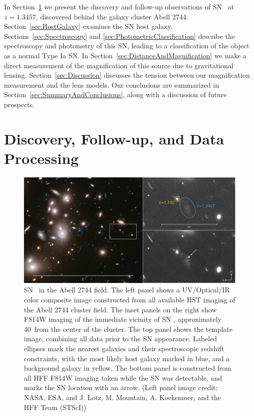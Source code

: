 In Section~\ref{sec:DiscoveryAndFollowup} we present the discovery and
follow-up observations of SN \tomas\ at $z=1.3457$, discovered behind
the galaxy cluster Abell 2744.  Section~\ref{sec:HostGalaxy} examines
the SN host galaxy.  Sections~\ref{sec:Spectroscopy}
and \ref{sec:PhotometricClassification} describe the spectroscopy and
photometry of this SN, leading to a classification of the object as a
normal Type Ia SN.  In Section~\ref{sec:DistanceAndMagnification} we
make a direct measurement of the magnification of this source due to
gravitational lensing.  Section~\ref{sec:Discussion} discusses the
tension between our magnification measurement and the lens models. Our
conclusions are summarized in Section~\ref{sec:SummaryAndConclusions},
along with a discussion of future prospects. 

\section{Discovery, Follow-up, and Data Processing}
\label{sec:DiscoveryAndFollowup}

\begin{figure}
\begin{center}
\includegraphics[width=\textwidth]{discovery_image_lowres}
\caption{  \label{fig:DiscoveryImage} 
SN \tomas\ in the Abell 2744 field.  The left panel shows a
UV/Optical/IR color composite image constructed from all available HST
imaging of the Abell 2744 cluster field.  The inset panels on the right
show F814W imaging of the immediate vicinity of SN \tomas,
approximately 40\arcsec\ from the center of the cluster. The top panel
shows the template image, combining all data prior to the SN
appearance.  Labeled ellipses mark the nearest galaxies and their
spectroscopic redshift constraints, with the most likely host
galaxy marked in blue, and a background galaxy in yellow. The bottom
panel is constructed from all HFF F814W imaging taken while the SN was
detectable, and marks the SN location with an arrow.  (Left panel
image credit: NASA, ESA, and J. Lotz, M. Mountain, A. Koekemoer, and
the HFF Team (STScI)) }
\end{center}
\end{figure}

